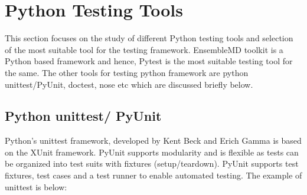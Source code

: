 \documentclass[10pt]{ruthesis}
\begin{document}

\section{Python Testing Tools}
This section focuses on the study of different Python testing tools and selection of the most suitable tool for the testing framework. EnsembleMD toolkit is a Python based framework and hence, Pytest is the most suitable testing tool for the same. The other tools for testing python framework are python unittest/PyUnit, doctest, nose etc which are discussed briefly below.

\subsection{Python unittest/ PyUnit}
Python's unittest framework, developed by Kent Beck and Erich Gamma is based on the XUnit framework. PyUnit supports modularity and is flexible as tests can be organized into test suits with fixtures (setup/teardown). PyUnit supports test fixtures, test cases and a test runner to enable automated testing. The example of unittest is below:
\end{document}
